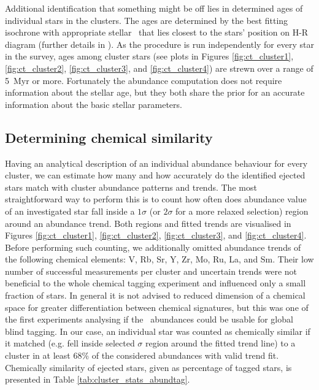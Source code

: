 Additional identification that something might be off lies in determined ages of individual stars in the clusters. The ages are determined by the best fitting isochrone with appropriate stellar \Feh\ that lies closest to the stars' position on H-R diagram (further details in \citet{buder2020}). As the procedure is run independently for every star in the survey, ages among cluster stars (see plots in Figures \ref{fig:ct_cluster1}, \ref{fig:ct_cluster2}, \ref{fig:ct_cluster3}, and \ref{fig:ct_cluster4}) are strewn over a range of 5~Myr or more. Fortunately the abundance computation does not require information about the stellar age, but they both share the prior for an accurate information about the basic stellar parameters.

\subsection{Determining chemical similarity}
\label{sec:chem_ej_tag}
Having an analytical description of an individual abundance behaviour for every cluster, we can estimate how many and how accurately do the identified ejected stars match with cluster abundance patterns and trends. The most straightforward way to perform this is to count how often does abundance value of an investigated star fall inside a $1\sigma$ (or $2\sigma$ for a more relaxed selection) region around an abundance trend. Both regions and fitted trends are visualised in Figures \ref{fig:ct_cluster1}, \ref{fig:ct_cluster2}, \ref{fig:ct_cluster3}, and \ref{fig:ct_cluster4}. Before performing such counting, we additionally omitted abundance trends of the following chemical elements: V, Rb, Sr, Y, Zr, Mo, Ru, La, and Sm. Their low number of successful measurements per cluster and uncertain trends were not beneficial to the whole chemical tagging experiment and influenced only a small fraction of stars. In general it is not advised to reduced dimension of a chemical space for greater differentiation between chemical signatures, but this was one of the first experiments analysing if the \Gh\ abundances could be usable for global blind tagging. In our case, an individual star was counted as chemically similar if it matched (e.g. fell inside selected $\sigma$ region around the fitted trend line) to a cluster in at least $68$\% of the considered abundances with valid trend fit. Chemically similarity of ejected stars, given as percentage of tagged stars, is presented in Table \ref{tab:cluster_stats_abundtag}.

